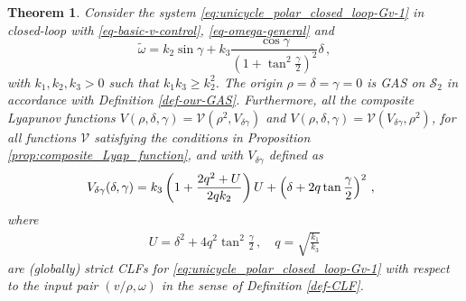 \documentclass[letterpaper, 10 pt, conference]{ieeeconf}  %
\newtheorem{theorem}{Theorem}
\begin{document}
\begin{theorem}
\label{thm:unicycle_CLF_BoLSA}
Consider the system \eqref{eq:unicycle_polar_closed_loop-Gv-1} in closed-loop with \eqref{eq-basic-v-control}, \eqref{eq-omega-general} and 
\begin{equation}
\label{eq-control-bounded-in-gamma}
\tilde\omega =  k_2\sin\gamma + k_3 \displaystyle
\frac{\cos\gamma}{\left(1+\displaystyle\tan^2\frac{\gamma}{2}\right)^2}\delta \,, 
\end{equation}
with  $k_1, k_2, k_3 > 0$ such that 
$k_1 k_3\geq k_2^2$.
The origin $\rho = \delta = \gamma = 0$ is GAS on $\mathcal{S}_2$ in accordance with Definition \ref{def-our-GAS}.
Furthermore, all the composite Lyapunov functions $V(\rho, \delta, \gamma) = \mathcal{V}(\rho^2, V_{\delta \gamma})$ and $V(\rho, \delta, \gamma) = \mathcal{V}(V_{\delta \gamma},\rho^2)$, for all functions $\mathcal{V}$ satisfying the conditions in Proposition \ref{prop:composite_Lyap_function}, and with $V_{\delta \gamma}$ defined as
\begin{equation}
\hspace*{-0.2cm}
\label{eq:CLF_Bolsa_delta_gamma}
V_{\delta \gamma}(\delta, \gamma) =  k_3  \left(1+
\frac{2q^2+U}{2qk_2}\right)U
+   \left (\delta+2q\tan \frac{\gamma}{2} \right)^2\,,
\end{equation}
where
\begin{align}
U=\delta^2+  4q^2 \tan^2\frac{\gamma}{2} \,, \quad q = \sqrt{\frac{k_1}{k_3}}
\end{align} 
are (globally) strict CLFs for \eqref{eq:unicycle_polar_closed_loop-Gv-1} with respect to the input pair $(v/\rho,\omega)$ in the sense of Definition \ref{def-CLF}. 
\end{theorem}
\end{document}
